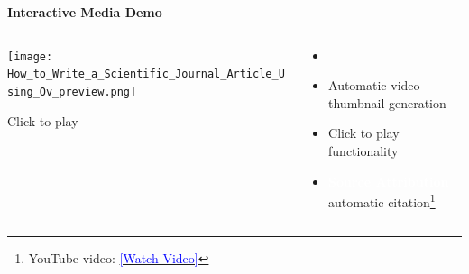 \documentclass[aspectratio=169]{beamer}
\newcommand{\hlkey}[1]{\colorbox{myblue!20}{\textcolor{white}{\textbf{#1}}}}
\begin{document}
\begin{frame}{\Large\textbf{Interactive Media Demo}}
    \begin{columns}[T]
        \begin{column}{0.48\textwidth}
            \texttt{[image: How\_to\_Write\_a\_Scientific\_Journal\_Article\_Using\_Ov\_preview.png]}
            \begin{center}
                \vspace{0.3em}
                \footnotesize{Click to play}\\
            \end{center}
        \end{column}
        \begin{column}{0.48\textwidth}
            \begin{itemize}
                \item {}
        \item Automatic video thumbnail generation
        \item Click to play functionality
        \item \hlkey{Source Attribution} automatic citation\footnote{YouTube video: \href{https://www.youtube.com/watch?v=58CoXgze71Y}{\textcolor{blue}{[Watch Video]}} }
            \end{itemize}
        \end{column}
    \end{columns}
\end{frame}
\end{document}
